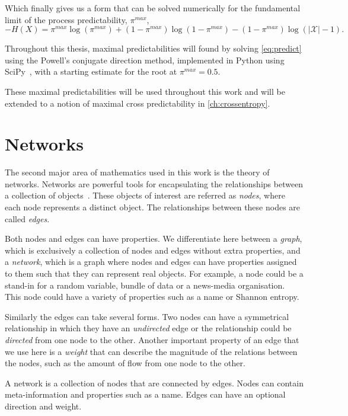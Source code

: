 Which finally gives us a form that can be solved numerically for the fundamental limit of the process predictability, $\pi^{max}$,
\begin{equation}\label{eq:predict}
-H(X)  = \pi^{max} \log(\pi^{max}) + (1 -  \pi^{max}) \log(1 - \pi^{max}) - (1 - \pi^{max}) \log (|\mathcal{X}| - 1).
\end{equation}


Throughout this thesis, maximal predictabilities will found by solving \autoref{eq:predict} using the Powell's conjugate direction method, implemented in Python using SciPy~\cite{virtanen_scipy_2019}, with a starting estimate for the root at $\pi^{max}=0.5$.

These maximal predictabilities will be used throughout this work and will be extended to a notion of maximal cross predictability in \autoref{ch:crossentropy}.


\section{Networks}

The second major area of mathematics used in this work is the theory of networks. Networks are powerful tools for encapsulating the relationships between a collection of objects~\cite{newman_networks_2018}. These objects of interest are referred as \emph{nodes}, where each node represents a distinct object. The relationships between these nodes are called \emph{edges}.

Both nodes and edges can have properties.  We differentiate here between a \emph{graph}, which is exclusively a collection of nodes and edges without extra properties, and a \emph{network}, which is a graph where nodes and edges can have properties assigned to them such that they can represent real objects. For example, a node could be a stand-in for a random variable, bundle of data or a news-media organisation. This node could have a variety of properties such as a name or Shannon entropy.

Similarly the edges can take several forms. Two nodes can have a symmetrical relationship in which they have an \emph{undirected} edge or the relationship could be \emph{directed} from one node to the other. Another important property of an edge that we use here is a \emph{weight} that can describe the magnitude of the relations between the nodes, such as the amount of flow from one node to the other.

\begin{definition}
	A network is a collection of nodes that are connected by edges. Nodes can contain meta-information and properties such as a name. Edges can have an optional direction and weight.
\end{definition}

